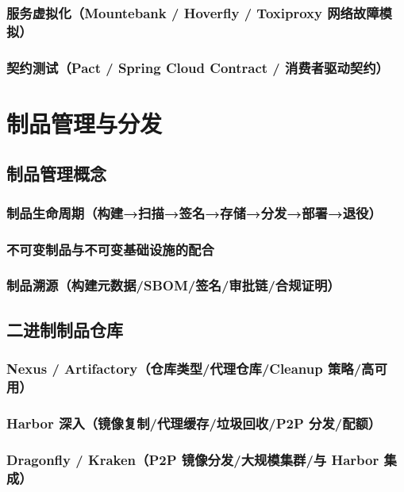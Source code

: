 \documentclass[12pt,UTF8]{ctexbook}
\begin{document}
    \subsection{服务虚拟化（Mountebank / Hoverfly / Toxiproxy 网络故障模拟）}
    \subsection{契约测试（Pact / Spring Cloud Contract / 消费者驱动契约）}


\chapter{制品管理与分发}
\label{chap:artifact-management}

  \section{制品管理概念}
    \subsection{制品生命周期（构建→扫描→签名→存储→分发→部署→退役）}
    \subsection{不可变制品与不可变基础设施的配合}
    \subsection{制品溯源（构建元数据/SBOM/签名/审批链/合规证明）}

  \section{二进制制品仓库}
    \subsection{Nexus / Artifactory（仓库类型/代理仓库/Cleanup 策略/高可用）}
    \subsection{Harbor 深入（镜像复制/代理缓存/垃圾回收/P2P 分发/配额）}
    \subsection{Dragonfly / Kraken（P2P 镜像分发/大规模集群/与 Harbor 集成）}
\end{document}
